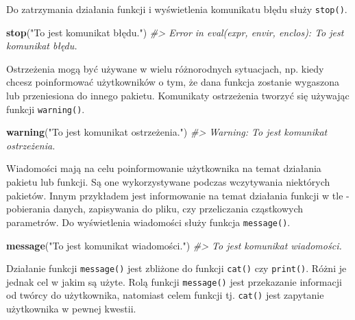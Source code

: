 \documentclass[paper=6in:9in,pagesize=pdftex,headinclude=on,footinclude=on,10pt]{scrbook}
\makeatletter
\newenvironment{Shaded}{\begin{snugshade}}{\end{snugshade}}
\newcommand{\CommentTok}[1]{\textcolor[rgb]{0.56,0.35,0.01}{\textit{#1}}}
\newcommand{\KeywordTok}[1]{\textcolor[rgb]{0.13,0.29,0.53}{\textbf{#1}}}
\newcommand{\NormalTok}[1]{#1}
\newcommand{\StringTok}[1]{\textcolor[rgb]{0.31,0.60,0.02}{#1}}
\newenvironment{kframe}{%
\medskip{}
\setlength{\fboxsep}{.8em}
 \def\at@end@of@kframe{}%
 \ifinner\ifhmode%
  \def\at@end@of@kframe{\end{minipage}}%
  \begin{minipage}{\columnwidth}%
 \fi\fi%
 \def\FrameCommand##1{\hskip\@totalleftmargin \hskip-\fboxsep
 \colorbox{shadecolor}{##1}\hskip-\fboxsep
     \hskip-\linewidth \hskip-\@totalleftmargin \hskip\columnwidth}%
 \MakeFramed {\advance\hsize-\width
   \@totalleftmargin\z@ \linewidth\hsize
   \@setminipage}}%
 {\par\unskip\endMakeFramed%
 \at@end@of@kframe}
\newenvironment{rmdblock}[1]
  {
  \begin{itemize}
  \renewcommand{\labelitemi}{
    \raisebox{-.7\height}[0pt][0pt]{
      {\setkeys{Gin}{width=3em,keepaspectratio}\texttt{[image: images/\#1]}}
    }
  }
  \setlength{\fboxsep}{1em}
  \begin{kframe}
  \item
  }
  {
  \end{kframe}
  \end{itemize}
  }
\newenvironment{rmdinfo}
  {\begin{rmdblock}{compass}}
  {\end{rmdblock}}
\makeatother
\begin{document}
Do zatrzymania działania funkcji i wyświetlenia komunikatu błędu służy \texttt{stop()}.

\begin{Shaded}
\begin{Highlighting}[]
\KeywordTok{stop}\NormalTok{(}\StringTok{"To jest komunikat błędu."}\NormalTok{)}
\CommentTok{#> Error in eval(expr, envir, enclos): To jest komunikat błędu.}
\end{Highlighting}
\end{Shaded}

Ostrzeżenia mogą być używane w wielu różnorodnych sytuacjach, np. kiedy chcesz poinformować użytkowników o tym, że dana funkcja zostanie wygaszona lub przeniesiona do innego pakietu.
Komunikaty ostrzeżenia tworzyć się używając funkcji \texttt{warning()}.

\begin{Shaded}
\begin{Highlighting}[]
\KeywordTok{warning}\NormalTok{(}\StringTok{"To jest komunikat ostrzeżenia."}\NormalTok{)}
\CommentTok{#> Warning: To jest komunikat ostrzeżenia.}
\end{Highlighting}
\end{Shaded}

Wiadomości mają na celu poinformowanie użytkownika na temat działania pakietu lub funkcji.
Są one wykorzystywane podczas wczytywania niektórych pakietów.
Innym przykładem jest informowanie na temat działania funkcji w tle - pobierania danych, zapisywania do pliku, czy przeliczania cząstkowych parametrów.
Do wyświetlenia wiadomości służy funkcja \texttt{message()}.

\begin{Shaded}
\begin{Highlighting}[]
\KeywordTok{message}\NormalTok{(}\StringTok{"To jest komunikat wiadomości."}\NormalTok{)}
\CommentTok{#> To jest komunikat wiadomości.}
\end{Highlighting}
\end{Shaded}

\begin{rmdinfo}
\begin{rmdinfo}

Działanie funkcji \texttt{message()} jest zbliżone do funkcji \texttt{cat()} czy \texttt{print()}.
Różni je jednak cel w jakim są użyte.
Rolą funkcji \texttt{message()} jest przekazanie informacji od twórcy do użytkownika, natomiast celem funkcji tj. \texttt{cat()} jest zapytanie użytkownika w pewnej kwestii.

\end{rmdinfo}
\end{rmdinfo}
\end{document}

